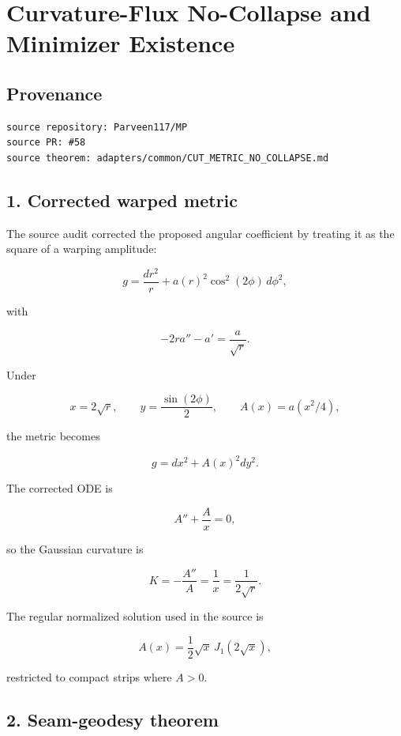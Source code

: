 \hypertarget{curvature-flux-no-collapse-and-minimizer-existence}{%
\chapter{Curvature-Flux No-Collapse and Minimizer Existence}\label{curvature-flux-no-collapse-and-minimizer-existence}}

\hypertarget{provenance}{%
\section{Provenance}\label{provenance}}

\begin{verbatim}
source repository: Parveen117/MP
source PR: #58
source theorem: adapters/common/CUT_METRIC_NO_COLLAPSE.md
\end{verbatim}

\hypertarget{corrected-warped-metric}{%
\section{1. Corrected warped metric}\label{corrected-warped-metric}}

The source audit corrected the proposed angular coefficient by treating it as the square of a warping amplitude:

\[
g=\frac{dr^2}{r}+a(r)^2\cos^2(2\phi)\,d\phi^2,
\]

with

\[
-2ra''-a'=\frac{a}{\sqrt r}.
\]

Under

\[
x=2\sqrt r,
\qquad
y=\frac{\sin(2\phi)}2,
\qquad
A(x)=a(x^2/4),
\]

the metric becomes

\[
\boxed{g=dx^2+A(x)^2dy^2.}
\]

The corrected ODE is

\[
A''+\frac{A}{x}=0,
\]

so the Gaussian curvature is

\[
\boxed{K=-\frac{A''}{A}=\frac1x=\frac1{2\sqrt r}.}
\]

The regular normalized solution used in the source is

\[
A(x)=\frac12\sqrt x\,J_1(2\sqrt x),
\]

restricted to compact strips where \(A>0\).

\hypertarget{seam-geodesy-theorem}{%
\section{2. Seam-geodesy theorem}\label{seam-geodesy-theorem}}

